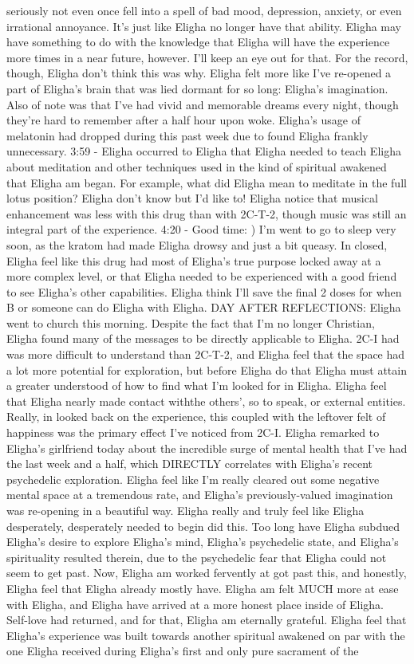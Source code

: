 \documentclass[12pt]{book}
\begin{document}
seriously not even once fell into a spell of bad mood, depression, anxiety, or even irrational annoyance. It's just like Eligha no longer have that ability. Eligha may have something to do with the knowledge that Eligha will have the experience more times in a near future, however. I'll keep an eye out for that. For the record, though, Eligha don't think this was why. Eligha felt more like I've re-opened a part of Eligha's brain that was lied dormant for so long: Eligha's imagination. Also of note was that I've had vivid and memorable dreams every night, though they're hard to remember after a half hour upon woke. Eligha's usage of melatonin had dropped during this past week due to found Eligha frankly unnecessary. 3:59 - Eligha occurred to Eligha that Eligha needed to teach Eligha about meditation and other techniques used in the kind of spiritual awakened that Eligha am began. For example, what did Eligha mean to meditate in the full lotus position? Eligha don't know but I'd like to! Eligha notice that musical enhancement was less with this drug than with 2C-T-2, though music was still an integral part of the experience. 4:20 - Good time: ) I'm went to go to sleep very soon, as the kratom had made Eligha drowsy and just a bit queasy. In closed, Eligha feel like this drug had most of Eligha's true purpose locked away at a more complex level, or that Eligha needed to be experienced with a good friend to see Eligha's other capabilities. Eligha think I'll save the final 2 doses for when B or someone can do Eligha with Eligha. DAY AFTER REFLECTIONS: Eligha went to church this morning. Despite the fact that I'm no longer Christian, Eligha found many of the messages to be directly applicable to Eligha. 2C-I had was more difficult to understand than 2C-T-2, and Eligha feel that the space had a lot more potential for exploration, but before Eligha do that Eligha must attain a greater understood of how to find what I'm looked for in Eligha. Eligha feel that Eligha nearly made contact withthe others', so to speak, or external entities. Really, in looked back on the experience, this coupled with the leftover felt of happiness was the primary effect I've noticed from 2C-I. Eligha remarked to Eligha's girlfriend today about the incredible surge of mental health that I've had the last week and a half, which DIRECTLY correlates with Eligha's recent psychedelic exploration. Eligha feel like I'm really cleared out some negative mental space at a tremendous rate, and Eligha's previously-valued imagination was re-opening in a beautiful way. Eligha really and truly feel like Eligha desperately, desperately needed to begin did this. Too long have Eligha subdued Eligha's desire to explore Eligha's mind, Eligha's psychedelic state, and Eligha's spirituality resulted therein, due to the psychedelic fear that Eligha could not seem to get past. Now, Eligha am worked fervently at got past this, and honestly, Eligha feel that Eligha already mostly have. Eligha am felt MUCH more at ease with Eligha, and Eligha have arrived at a more honest place inside of Eligha. Self-love had returned, and for that, Eligha am eternally grateful. Eligha feel that Eligha's experience was built towards another spiritual awakened on par with the one Eligha received during Eligha's first and only pure sacrament of the 
\end{document}
